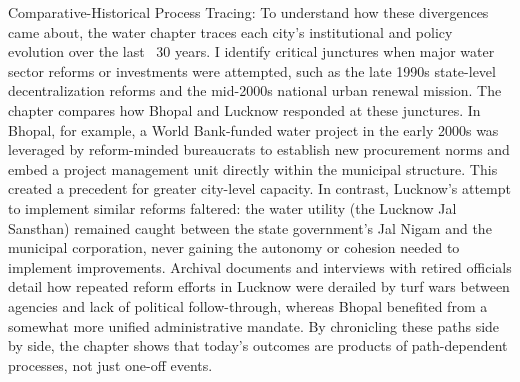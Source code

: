 Comparative-Historical Process Tracing: To understand how these divergences came about, the water chapter traces each city’s institutional and policy evolution over the last ~30 years. I identify critical junctures when major water sector reforms or investments were attempted, such as the late 1990s state-level decentralization reforms and the mid-2000s national urban renewal mission. The chapter compares how Bhopal and Lucknow responded at these junctures. In Bhopal, for example, a World Bank-funded water project in the early 2000s was leveraged by reform-minded bureaucrats to establish new procurement norms and embed a project management unit directly within the municipal structure. This created a precedent for greater city-level capacity. In contrast, Lucknow’s attempt to implement similar reforms faltered: the water utility (the Lucknow Jal Sansthan) remained caught between the state government’s Jal Nigam and the municipal corporation, never gaining the autonomy or cohesion needed to implement improvements. Archival documents and interviews with retired officials detail how repeated reform efforts in Lucknow were derailed by turf wars between agencies and lack of political follow-through, whereas Bhopal benefited from a somewhat more unified administrative mandate. By chronicling these paths side by side, the chapter shows that today’s outcomes are products of path-dependent processes, not just one-off events.


